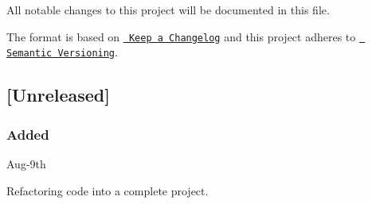 All notable changes to this project will be documented in this file.

The format is based on \href{http://keepachangelog.com/}{\texttt{ Keep a Changelog}} and this project adheres to \href{http://semver.org/}{\texttt{ Semantic Versioning}}.

\subsection*{\mbox{[}Unreleased\mbox{]}}

\subsubsection*{Added}


\begin{DoxyItemize}
\item Aug-\/9th
\begin{DoxyItemize}
\item Refactoring code into a complete project. 
\end{DoxyItemize}
\end{DoxyItemize}